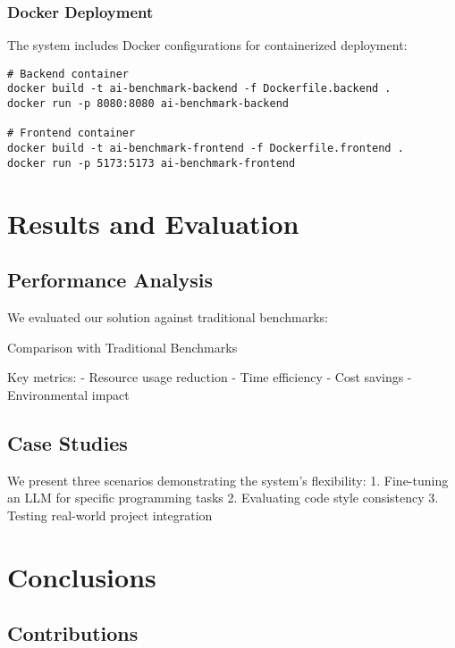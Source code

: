 \subsection{Docker Deployment}
The system includes Docker configurations for containerized deployment:

\begin{verbatim}
# Backend container
docker build -t ai-benchmark-backend -f Dockerfile.backend .
docker run -p 8080:8080 ai-benchmark-backend

# Frontend container
docker build -t ai-benchmark-frontend -f Dockerfile.frontend .
docker run -p 5173:5173 ai-benchmark-frontend
\end{verbatim}

\chapter{Results and Evaluation}

\section{Performance Analysis}

We evaluated our solution against traditional benchmarks:

\begin{table}[h]
    \centering
    \caption{Comparison with Traditional Benchmarks}
    \label{tab:comparison}
\end{table}

Key metrics:
- Resource usage reduction
- Time efficiency
- Cost savings
- Environmental impact

\section{Case Studies}

We present three scenarios demonstrating the system's flexibility:
1. Fine-tuning an LLM for specific programming tasks
2. Evaluating code style consistency
3. Testing real-world project integration

\chapter{Conclusions}

\section{Contributions}

